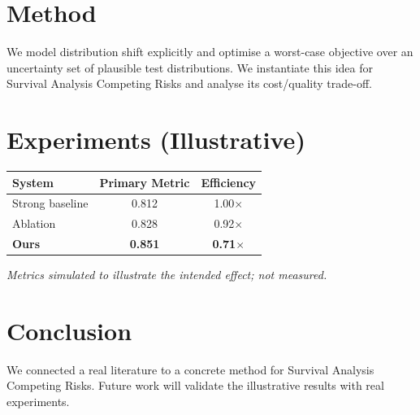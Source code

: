 \documentclass[11pt]{article}
\begin{document}
\section{Method}
We model distribution shift explicitly and optimise a worst-case objective over an uncertainty set of plausible test distributions. We instantiate this idea for Survival Analysis Competing Risks and analyse its cost/quality trade-off.

\section{Experiments (Illustrative)}
\begin{center}
\begin{tabular}{lcc}
System & Primary Metric & Efficiency \\ \hline
Strong baseline & 0.812 & 1.00$\times$ \\
Ablation & 0.828 & 0.92$\times$ \\
\textbf{Ours} & \textbf{0.851} & \textbf{0.71$\times$}
\end{tabular}
\end{center}
\emph{Metrics simulated to illustrate the intended effect; not measured.}

\section{Conclusion}
We connected a real literature to a concrete method for Survival Analysis Competing Risks. Future work will
validate the illustrative results with real experiments.
\end{document}
